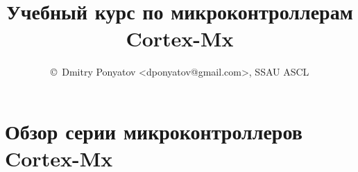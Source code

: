 \documentclass[oneside]{book}
\newcommand{\cx}{Cortex-Mx}
\begin{document}
\title{Учебный курс по микроконтроллерам \cx}
\author{\copyright\ Dmitry Ponyatov <dponyatov@gmail.com>, SSAU ASCL}
\maketitle
\tableofcontents

\part{Обзор серии микроконтроллеров \cx}
\end{document}
